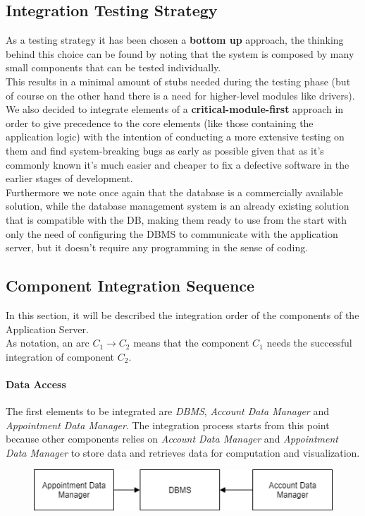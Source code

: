 \subsection{Integration Testing Strategy}
As a testing strategy it has been chosen a \textbf{bottom up} approach, the thinking behind this choice can be found by noting that the system is composed by many small components that can be tested individually.\\
This results in a minimal amount of stubs needed during the testing phase (but of course on the other hand there is a need for higher-level modules like drivers).\\
We also decided to integrate elements of a \textbf{critical-module-first} approach in order to give precedence to the core elements (like those containing the application logic) with the intention of conducting a more extensive testing on them and find system-breaking bugs as early as possible given that as it's commonly known it's much easier and cheaper to fix a defective software in the earlier stages of development.\\
Furthermore we note once again that the database is a commercially available solution, while the database management system is an already existing solution that is compatible with the DB, making them ready to use from the start with only the need of configuring the DBMS to communicate with the application server, but it doesn't require any programming in the sense of coding.

\subsection{Component Integration Sequence}

In this section, it will be described the integration order of the components of the Application Server.\\
As notation, an arc $C_1 \rightarrow C_2$ means that the component $C_1$ needs the successful integration of component $C_2$.


\paragraph*{Data Access\\}
The first elements to be integrated are \emph{DBMS}, \emph{Account Data Manager} and \emph{Appointment Data Manager}. 
The integration process starts from this point because other components relies on \emph{Account Data Manager} and \emph{Appointment Data Manager} to store data and retrieves data for computation and visualization.
\begin{figure}[H]
	\includegraphics[width=\textwidth, keepaspectratio=true]{Img/FirstStep}
\end{figure}

